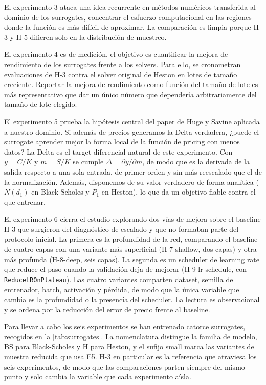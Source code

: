 \documentclass[11pt,a4paper]{article}
\begin{document}
El experimento 3 ataca una idea recurrente en métodos numéricos transferida al dominio de los surrogates, concentrar el esfuerzo computacional en las regiones donde la función es más difícil de aproximar. La comparación es limpia porque H-3 y H-5 difieren solo en la distribución de muestreo.

El experimento 4 es de medición, el objetivo es cuantificar la mejora de rendimiento de los surrogates frente a los solvers. Para ello, se cronometran evaluaciones de H-3 contra el solver original de Heston en lotes de tamaño creciente. Reportar la mejora de rendimiento como función del tamaño de lote es más representativo que dar un único número que dependería arbitrariamente del tamaño de lote elegido.

El experimento 5 prueba la hipótesis central del paper de Huge y Savine aplicada a nuestro dominio. Si además de precios generamos la Delta verdadera, ¿puede el surrogate aprender mejor la forma local de la función de pricing con menos datos? La Delta es el target diferencial natural de este experimento. Con $y = C/K$ y $m = S/K$ se cumple $\Delta = \partial y / \partial m$, de modo que es la derivada de la salida respecto a una sola entrada, de primer orden y sin más reescalado que el de la normalización. Además, disponemos de su valor verdadero de forma analítica ($N(d_1)$ en Black-Scholes y $P_1$ en Heston), lo que da un objetivo fiable contra el que entrenar.

El experimento 6 cierra el estudio explorando dos vías de mejora sobre el baseline H-3 que surgieron del diagnóstico de escalado y que no formaban parte del protocolo inicial. La primera es la profundidad de la red, comparando el baseline de cuatro capas con una variante más superficial (H-7-shallow, dos capas) y otra más profunda (H-8-deep, seis capas). La segunda es un scheduler de learning rate que reduce el paso cuando la validación deja de mejorar (H-9-lr-schedule, con \texttt{ReduceLROnPlateau}). Las cuatro variantes comparten dataset, semilla del entrenador, batch, activación y pérdida, de modo que la única variable que cambia es la profundidad o la presencia del scheduler. La lectura es observacional y se ordena por la reducción del error de precio frente al baseline.

Para llevar a cabo los seis experimentos se han entrenado catorce surrogates, recogidos en la \autoref{tab:surrogates}. La nomenclatura distingue la familia de modelo, BS para Black-Scholes y H para Heston, y el sufijo small marca las variantes de muestra reducida que usa E5. H-3 en particular es la referencia que atraviesa los seis experimentos, de modo que las comparaciones parten siempre del mismo punto y solo cambia la variable que cada experimento aísla.
\end{document}
